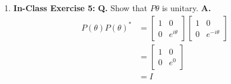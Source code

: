 \documentclass[main.tex]{subfiles}
\begin{document}
\begin{enumerate}
\begin{enumerate}
\begin{align*}
\begin{array}{ll}
                                -\sin(\beta_1)\cos(\beta_2) - \cos(\beta_1)\sin(\beta_2)&
                                -\sin(\beta_1)\sin(\beta_2) + \cos(\beta_1)\cos(\beta_2)\end{array}\right]\\
                                & = R\left(\beta_{2}\right) R\left(\beta_{1}\right)
    \end{align*}
    \item [3.] $K\left(\delta_{1}\right) K\left(\delta_{2}\right)=K\left(\delta_{2}\right) K\left(\delta_{1}\right)$
    \begin{align*}
        K\left(\delta_{1}\right) K\left(\delta_{2}\right)   & = \left[\begin{array}{cc}e^{i \delta_1} & 0 \\
                                                            0 & e^{i \delta_1}\end{array}\right]
                                                            \left[\begin{array}{cc}e^{i \delta_2} & 0 \\
                                                            0 & e^{i \delta_2}\end{array}\right]\\
                                                            & = \left[\begin{array}{cc}e^{i (\delta_{1}+\delta_{2})}&0\\
                                                            0 & e^{i(\delta_{1}+\delta_{2})}\end{array}\right]\\
                                                            & = K\left(\delta_{2}\right) K\left(\delta_{1}\right)
    \end{align*}
\end{enumerate}

\item[] \textbf{In-Class Exercise 5:} \textbf{Q.} Show that $P\theta$ is unitary. \textbf{A.}
    \begin{align*}
        P(\theta)P(\theta)^{*}  & = \left[\begin{array}{ll}1 & 0 \\0 & e^{i \theta} \end{array}\right]
                                \left[\begin{array}{ll}1 & 0 \\0 & e^{-i \theta} \end{array}\right]\\
                                & = \left[\begin{array}{ll}1 & 0 \\0 & e^{0} \end{array}\right]\\
                                & = I
    \end{align*}


\end{enumerate}
\end{document}
